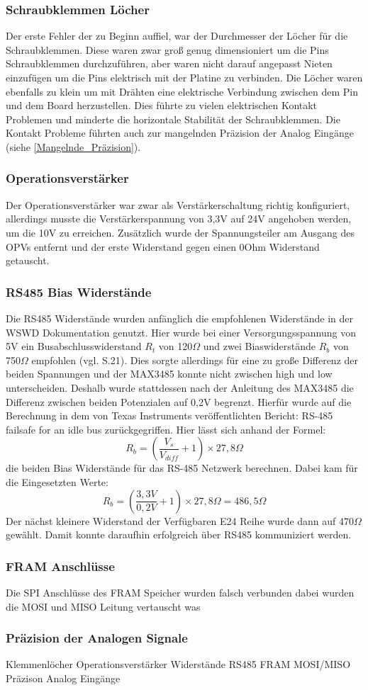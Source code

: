 \subsubsection{Schraubklemmen Löcher}
Der erste Fehler der zu Beginn auffiel, war der Durchmesser der Löcher für die Schraubklemmen. Diese waren zwar groß genug dimensioniert um die Pins Schraubklemmen durchzuführen, aber waren nicht darauf angepasst Nieten einzufügen um die Pins elektrisch mit der Platine zu verbinden. Die Löcher waren ebenfalls zu klein um mit Drähten eine elektrische Verbindung zwischen dem Pin und dem Board herzustellen. Dies führte zu vielen elektrischen Kontakt Problemen und minderte die horizontale Stabilität der Schraubklemmen. Die Kontakt Probleme führten auch zur mangelnden Präzision der Analog Eingänge (siehe \autoref{Mangelnde_Präzision}).
\subsubsection{Operationsverstärker}
Der Operationsverstärker war zwar als Verstärkerschaltung richtig konfiguriert, allerdings musste die Verstärkerspannung von 3,3V auf 24V angehoben werden, um die 10V zu erreichen. Zusätzlich wurde der Spannungsteiler am Ausgang des OPVs entfernt und der erste Widerstand gegen einen 0Ohm Widerstand getauscht.
\subsubsection{RS485 Bias Widerstände}
Die RS485 Widerstände wurden anfänglich die empfohlenen Widerstände in der WSWD Dokumentation genutzt. Hier wurde bei einer Versorgungsspannung von 5V ein Busabschlusswiderstand $R_t$ von 120$\Omega$ und zwei Biaswiderstände $R_b$ von 750$\Omega$ empfohlen (vgl.\cite{WSWD} S.21). Dies sorgte allerdings für eine zu große Differenz der beiden Spannungen und der MAX3485 konnte nicht zwischen high und low unterscheiden. Deshalb wurde stattdessen nach der Anleitung des MAX3485 die Differenz zwischen beiden Potenzialen auf 0,2V begrenzt. Hierfür wurde auf die Berechnung in dem von Texas Instruments veröffentlichten Bericht: \glqq{}RS-485 failsafe for an idle bus\grqq{} zurückgegriffen. Hier lässt sich anhand der Formel: 
\begin{equation}
	R_b = (\frac{V_s}{V_{diff }}+1)\times27,8\Omega
\end{equation}
die beiden Bias Widerstände für das RS-485 Netzwerk berechnen. Dabei kam für die Eingesetzten Werte:
\begin{equation}
	R_b = (\frac{3,3V}{0,2V}+1)\times27,8\Omega = 486,5\Omega
\end{equation}
Der nächst kleinere Widerstand der Verfügbaren E24 Reihe wurde dann auf 470$\Omega$ gewählt. Damit konnte daraufhin erfolgreich über RS485 kommuniziert werden.
\subsubsection{FRAM Anschlüsse}
Die SPI Anschlüsse des FRAM Speicher wurden falsch verbunden dabei wurden die MOSI und MISO Leitung vertauscht was 
\subsubsection{Präzision der Analogen Signale}
Klemmenlöcher
Operationsverstärker
Widerstände RS485
FRAM MOSI/MISO
Präzison Analog Eingänge